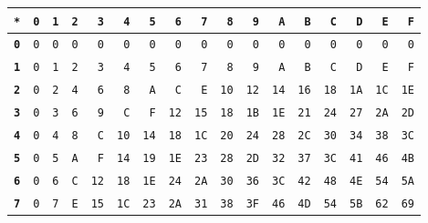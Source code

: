 \begin{tabular}{rrrrrrrrrrrrrrrrr}
\toprule
\textbf{\texttt{*}}& \textbf{\texttt{0}}& \textbf{\texttt{1}}& \textbf{\texttt{2}}& \textbf{\texttt{3}}& \textbf{\texttt{4}}& \textbf{\texttt{5}}& \textbf{\texttt{6}}& \textbf{\texttt{7}}& \textbf{\texttt{8}}& \textbf{\texttt{9}}& \textbf{\texttt{A}}& \textbf{\texttt{B}}& \textbf{\texttt{C}}& \textbf{\texttt{D}}& \textbf{\texttt{E}}& \textbf{\texttt{F}}\\ \midrule
\textbf{\texttt{0}} & \texttt{0} & \texttt{0} & \texttt{0} & \texttt{0} & \texttt{0} & \texttt{0} & \texttt{0} & \texttt{0} & \texttt{0} & \texttt{0} & \texttt{0} & \texttt{0} & \texttt{0} & \texttt{0} & \texttt{0} & \texttt{0}\\
\textbf{\texttt{1}} & \texttt{0} & \texttt{1} & \texttt{2} & \texttt{3} & \texttt{4} & \texttt{5} & \texttt{6} & \texttt{7} & \texttt{8} & \texttt{9} & \texttt{A} & \texttt{B} & \texttt{C} & \texttt{D} & \texttt{E} & \texttt{F}\\
\textbf{\texttt{2}} & \texttt{0} & \texttt{2} & \texttt{4} & \texttt{6} & \texttt{8} & \texttt{A} & \texttt{C} & \texttt{E} & \texttt{10} & \texttt{12} & \texttt{14} & \texttt{16} & \texttt{18} & \texttt{1A} & \texttt{1C} & \texttt{1E}\\
\textbf{\texttt{3}} & \texttt{0} & \texttt{3} & \texttt{6} & \texttt{9} & \texttt{C} & \texttt{F} & \texttt{12} & \texttt{15} & \texttt{18} & \texttt{1B} & \texttt{1E} & \texttt{21} & \texttt{24} & \texttt{27} & \texttt{2A} & \texttt{2D}\\
\textbf{\texttt{4}} & \texttt{0} & \texttt{4} & \texttt{8} & \texttt{C} & \texttt{10} & \texttt{14} & \texttt{18} & \texttt{1C} & \texttt{20} & \texttt{24} & \texttt{28} & \texttt{2C} & \texttt{30} & \texttt{34} & \texttt{38} & \texttt{3C}\\
\textbf{\texttt{5}} & \texttt{0} & \texttt{5} & \texttt{A} & \texttt{F} & \texttt{14} & \texttt{19} & \texttt{1E} & \texttt{23} & \texttt{28} & \texttt{2D} & \texttt{32} & \texttt{37} & \texttt{3C} & \texttt{41} & \texttt{46} & \texttt{4B}\\
\textbf{\texttt{6}} & \texttt{0} & \texttt{6} & \texttt{C} & \texttt{12} & \texttt{18} & \texttt{1E} & \texttt{24} & \texttt{2A} & \texttt{30} & \texttt{36} & \texttt{3C} & \texttt{42} & \texttt{48} & \texttt{4E} & \texttt{54} & \texttt{5A}\\
\textbf{\texttt{7}} & \texttt{0} & \texttt{7} & \texttt{E} & \texttt{15} & \texttt{1C} & \texttt{23} & \texttt{2A} & \texttt{31} & \texttt{38} & \texttt{3F} & \texttt{46} & \texttt{4D} & \texttt{54} & \texttt{5B} & \texttt{62} & \texttt{69}\\

\end{tabular}
